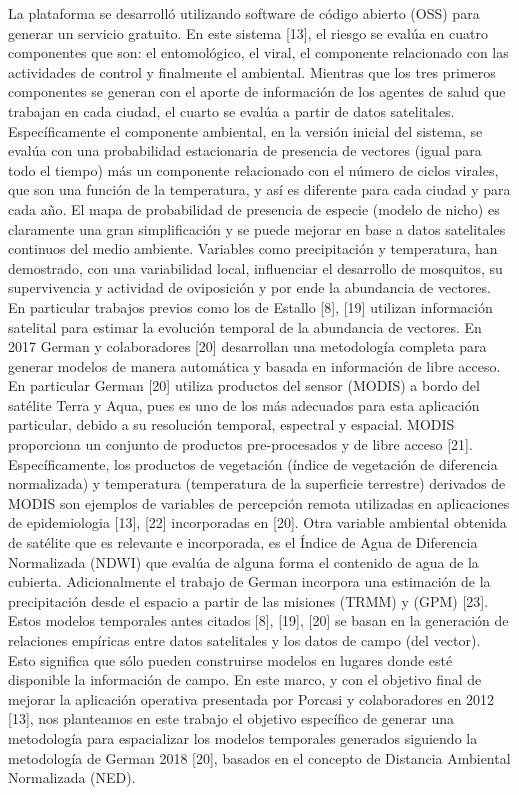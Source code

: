 La plataforma se desarrolló utilizando software de código abierto (OSS) para
generar un servicio gratuito. En este sistema [13], el riesgo
se evalúa en cuatro componentes que son: el entomológico,
el viral, el componente relacionado con las actividades de
control y finalmente el ambiental. Mientras que los tres
primeros componentes se generan con el aporte de
información de los agentes de salud que trabajan en cada
ciudad, el cuarto se evalúa a partir de datos satelitales.
Específicamente el componente ambiental, en la versión
inicial del sistema, se evalúa con una probabilidad
estacionaria de presencia de vectores (igual para todo el
tiempo) más un componente relacionado con el número de
ciclos virales, que son una función de la temperatura, y así
es diferente para cada ciudad y para cada año. El mapa de
probabilidad de presencia de especie (modelo de nicho) es
claramente una gran simplificación y se puede mejorar en
base a datos satelitales continuos del medio ambiente.
Variables como precipitación y temperatura, han
demostrado, con una variabilidad local, influenciar el
desarrollo de mosquitos, su supervivencia y actividad de
oviposición y por ende la abundancia de vectores. En
particular trabajos previos como los de Estallo [8], [19]
utilizan información satelital para estimar la evolución
temporal de la abundancia de vectores. En 2017 German y
colaboradores [20] desarrollan una metodología completa
para generar modelos de manera automática y basada en
información de libre acceso. En particular German [20]
utiliza productos del sensor (MODIS) a bordo del satélite
Terra y Aqua, pues es uno de los más adecuados para esta
aplicación particular, debido a su resolución temporal,
espectral y espacial. MODIS proporciona un conjunto de
productos pre-procesados y de libre acceso [21].
Específicamente, los productos de vegetación (índice de
vegetación de diferencia normalizada) y temperatura
(temperatura de la superficie terrestre) derivados de MODIS
son ejemplos de variables de percepción remota utilizadas
en aplicaciones de epidemiologia [13], [22] incorporadas en
[20]. Otra variable ambiental obtenida de satélite que es
relevante e incorporada, es el Índice de Agua de Diferencia
Normalizada (NDWI) que evalúa de alguna forma el
contenido de agua de la cubierta. Adicionalmente el trabajo
de German incorpora una estimación de la precipitación
desde el espacio a partir de las misiones (TRMM) y (GPM)
[23].
Estos modelos temporales antes citados [8], [19], [20] se
basan en la generación de relaciones empíricas entre datos
satelitales y los datos de campo (del vector). Esto significa
que sólo pueden construirse modelos en lugares donde esté
disponible la información de campo. En este marco, y con
el objetivo final de mejorar la aplicación operativa
presentada por Porcasi y colaboradores en 2012 [13], nos
planteamos en este trabajo el objetivo específico de generar
una metodología para espacializar los modelos temporales
generados siguiendo la metodología de German 2018 [20],
basados en el concepto de Distancia Ambiental
Normalizada (NED).
